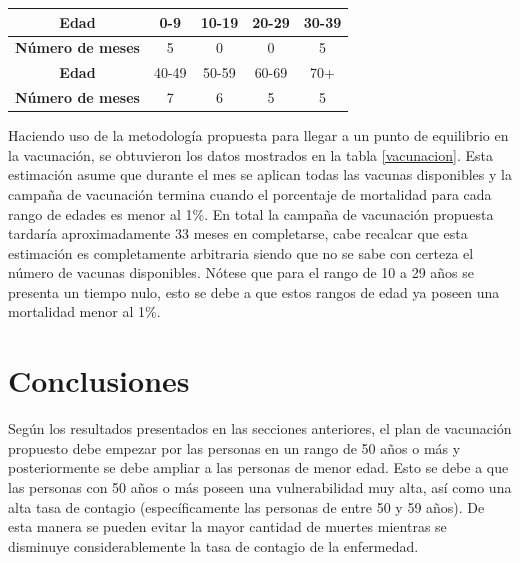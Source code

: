 \documentclass[12pt,a4paper]{article}
\begin{document}
\begin{center}
\begin{tabular}{|c|c|c|c|c|}
\hline
\rowcolor[HTML]{C0C0C0} 
\textbf{Edad}                                    & 0-9   & 10-19 & 20-29 & 30-39 \\ \hline
\cellcolor[HTML]{C0C0C0}\textbf{Número de meses} & 5     & 0     & 0     & 5     \\ \hline
\rowcolor[HTML]{C0C0C0} 
\textbf{Edad}                                    & 40-49 & 50-59 & 60-69 & 70+   \\ \hline
\cellcolor[HTML]{C0C0C0}\textbf{Número de meses} & 7     & 6     & 5     & 5     \\ \hline
\end{tabular}
\end{center}

Haciendo uso de la metodología propuesta para llegar a un punto de equilibrio en la vacunación, se obtuvieron los datos mostrados en la tabla \ref{vacunacion}. Esta estimación asume que durante el mes se aplican todas las vacunas disponibles y la campaña de vacunación termina cuando el porcentaje de mortalidad para cada rango de edades es menor al 1\%. En total la campaña de vacunación propuesta tardaría aproximadamente 33 meses en completarse, cabe recalcar que esta estimación es completamente arbitraria siendo que no se sabe con certeza el número de vacunas disponibles. Nótese que para el rango de 10 a 29 años se presenta un tiempo nulo, esto se debe a que estos rangos de edad ya poseen una mortalidad menor al 1\%. 

\setlength{\parindent}{1cm}

\section{Conclusiones}
\setlength{\parindent}{0cm}
Según los resultados presentados en las secciones anteriores, el plan de vacunación propuesto debe empezar por las personas en un rango de 50 años o más y posteriormente se debe ampliar a las personas de menor edad. Esto se debe a que las personas con 50 años o más poseen una vulnerabilidad muy alta, así como una alta tasa de contagio (específicamente las personas de entre 50 y 59 años). De esta manera se pueden evitar la mayor cantidad de muertes mientras se disminuye considerablemente la tasa de contagio de la enfermedad.

\setlength{\parindent}{1cm}
\newpage


\end{document}

